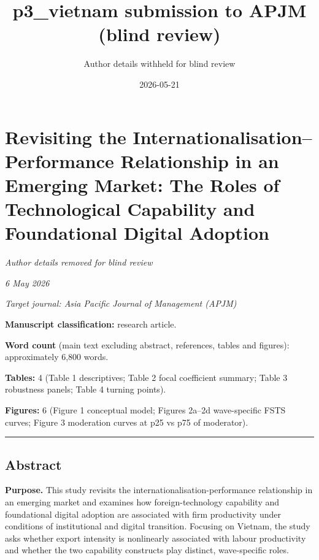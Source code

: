 \documentclass[12pt,a4paper]{article}
\title{p3\_vietnam submission to APJM (blind review)}
\author{Author details withheld for blind review}
\date{2026-05-21}
\begin{document}
\maketitle

\hypertarget{revisiting-the-internationalisationperformance-relationship-in-an-emerging-market-the-roles-of-technological-capability-and-foundational-digital-adoption}{%
\section{Revisiting the Internationalisation--Performance Relationship
in an Emerging Market: The Roles of Technological Capability and
Foundational Digital
Adoption}\label{revisiting-the-internationalisationperformance-relationship-in-an-emerging-market-the-roles-of-technological-capability-and-foundational-digital-adoption}}

\emph{Author details removed for blind review}

\emph{6 May 2026}

\emph{Target journal: Asia Pacific Journal of Management (APJM)}

\textbf{Manuscript classification:} research article.

\textbf{Word count} (main text excluding abstract, references, tables
and figures): approximately 6,800 words.

\textbf{Tables:} 4 (Table 1 descriptives; Table 2 focal coefficient
summary; Table 3 robustness panels; Table 4 turning points).

\textbf{Figures:} 6 (Figure 1 conceptual model; Figures 2a--2d
wave-specific FSTS curves; Figure 3 moderation curves at p25 vs p75 of
moderator).

\begin{center}\rule{0.5\linewidth}{0.5pt}\end{center}

\hypertarget{abstract}{%
\subsection{Abstract}\label{abstract}}

\textbf{Purpose.} This study revisits the
internationalisation-performance relationship in an emerging market and
examines how foreign-technology capability and foundational digital
adoption are associated with firm productivity under conditions of
institutional and digital transition. Focusing on Vietnam, the study
asks whether export intensity is nonlinearly associated with labour
productivity and whether the two capability constructs play distinct,
wave-specific roles.
\end{document}
